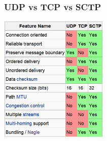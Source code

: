 \documentclass[notes,serif]{beamer}
\begin{document}
\begin{frame}
  \frametitle{UDP vs TCP vs SCTP}
  \begin{center}
  \includegraphics[height=6cm]{figs/udp-tcp-sctp-comparison.png}
  \end{center}
\end{frame}
\end{document}
